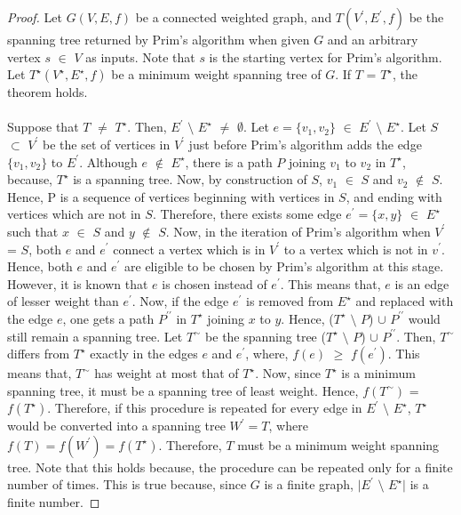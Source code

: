 \documentclass[12pt]{article}
\numberwithin{equation}{subsection}
\numberwithin{table}{subsection}
\numberwithin{algorithm}{subsection}
\numberwithin{figure}{subsection}
\begin{document}
\begin{proof}
Let $G(V,E,f)$ be a connected weighted graph, and $T(V^\prime,E^\prime,f)$ be the spanning tree returned by Prim's algorithm when given $G$ and an arbitrary vertex $s$ $\in$ $V$ as inputs. Note that $s$ is the starting vertex for Prim's algorithm. Let $T^\star(V^\star,E^\star,f)$ be a minimum weight spanning tree of $G$. If $T$ = $T^\star$, the theorem holds.\\\\
Suppose that $T$ $\neq$ $T^\star$. Then,  $E^\prime$ $\setminus$ $E^\star$ $\neq$ $\emptyset$. Let $e = \{v_1, v_2\}$ $\in$  $E^\prime$ $\setminus$ $E^\star$. Let $S$ $\subset$ $V^\prime$ be the set of vertices in $V^\prime$ just before Prim's algorithm adds the edge $\{v_1, v_2\}$ to $E^\prime$. Although $e$ $\notin$ $E^\star$, there is a path $P$ joining $v_1$ to $v_2$ in $T^\star$, because, $T^\star$ is a spanning tree. Now, by construction of $S$, $v_1$ $\in$ $S$ and $v_2$ $\notin$ $S$. Hence, P is a sequence of vertices beginning with vertices in $S$, and ending with vertices which are not in $S$. Therefore, there exists some edge $e^\prime = \{x,y\}$ $\in$ $E^\star$ such that $x$ $\in$ $S$ and $y$ $\notin$ $S$. Now, in the iteration of Prim's algorithm when $V^\prime$ = $S$, both $e$ and $e^\prime$ connect a vertex which is in $V^\prime$ to a vertex which is not in $v^\prime$. Hence, both $e$ and $e^\prime$ are eligible to be chosen by Prim's algorithm at this stage. However, it is known that $e$ is chosen instead of $e^\prime$. This means that, $e$ is an edge of lesser weight than $e^\prime$. Now, if the edge $e^\prime$ is removed from $E^\star$ and replaced with the edge $e$, one gets a path $P^{\prime\prime}$ in $T^\star$ joining $x$ to $y$. Hence, ($T^\star$ $\setminus$ $P$) $\cup$ $P^{\prime\prime}$ would still remain a spanning tree. Let $T^\sim$ be the spanning tree ($T^\star$ $\setminus$ $P$) $\cup$ $P^{\prime\prime}$. Then, $T^\sim$ differs from $T^\star$ exactly in the edges $e$ and $e^\prime$, where, $f(e)$ $\geq$ $f(e^\prime)$. This means that, $T^\sim$ has weight at most that of $T^\star$. Now, since $T^\star$ is a minimum spanning tree, it must be a spanning tree of least weight. Hence, $f(T^\sim)$ = $f(T^\star)$. Therefore, if this procedure is repeated for every edge in $E^\prime$ $\setminus$ $E^\star$, $T^\star$ would be converted into a spanning tree $W^\prime = T$, where $f(T) = f(W^\prime) = f(T^\star)$. Therefore, $T$ must be a minimum weight spanning tree. Note that this holds because, the procedure can be repeated only for a finite number of times. This is true because, since $G$ is a finite graph, $|E^\prime$ $\setminus$ $E^\star|$ is a finite number.
\end{proof}
\end{document}
